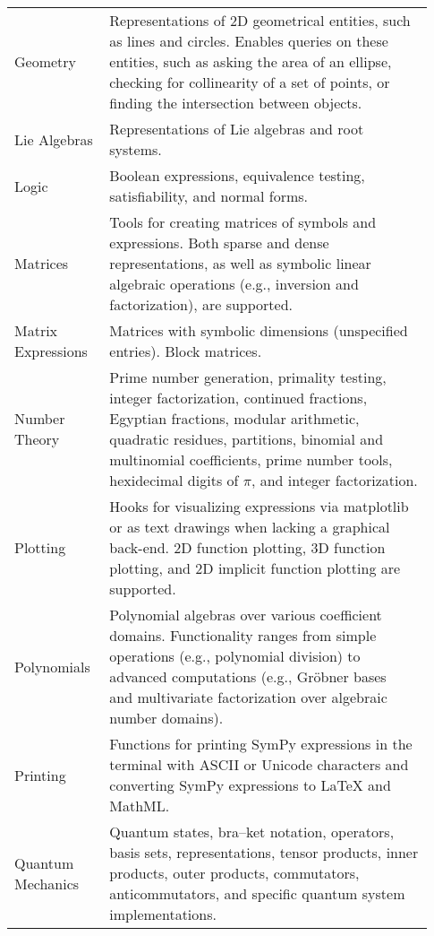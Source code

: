 \begin{longtable}[htbc]{p{0.20\linewidth}p{0.73\linewidth}}
Geometry & Representations of 2D geometrical entities, such as lines and
circles. Enables queries on these entities, such as asking the area of an
ellipse, checking for collinearity of a set of
points, or finding the intersection between objects.\\

Lie Algebras & Representations of Lie algebras and root systems.\\

Logic & Boolean expressions, equivalence testing, satisfiability, and normal
forms.\\

Matrices & Tools for creating matrices of symbols and expressions.
Both sparse and dense representations, as well as symbolic linear
algebraic operations (e.g., inversion and factorization), are
supported.\\

Matrix Expressions & Matrices with symbolic dimensions (unspecified entries).
Block matrices.\\

Number Theory & Prime number generation, primality testing, integer
factorization, continued fractions, Egyptian fractions, modular arithmetic,
quadratic residues, partitions, binomial and multinomial coefficients,
prime number tools, hexidecimal digits of $\pi$, and integer factorization. \\

Plotting & Hooks for visualizing expressions via matplotlib~\cite{Hunter:2007}
or as text drawings when lacking a graphical back-end. 2D function plotting,
3D function
plotting, and 2D implicit function plotting are supported.\\

Polynomials & Polynomial algebras over various coefficient domains.
Functionality ranges from simple operations (e.g., polynomial division) to
advanced computations (e.g., Gr\"obner bases~\cite{adams1994introduction} and multivariate
factorization over algebraic number domains).\\

Printing & Functions for printing SymPy expressions in the terminal with ASCII
or Unicode characters and converting SymPy expressions to \LaTeX{} and
MathML.\\

Quantum Mechanics & Quantum states, bra--ket notation, operators, basis sets,
representations, tensor products, inner products, outer products, commutators,
anticommutators, and specific quantum system implementations.\\


\end{longtable}

